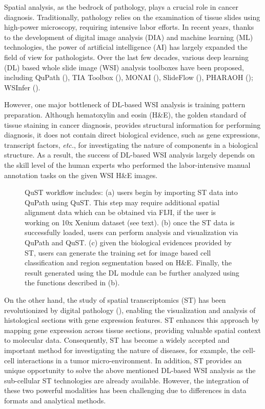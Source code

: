 \documentclass{article}
\begin{document}
Spatial analysis, as the bedrock of pathology, plays a crucial role in cancer diagnosis. Traditionally, pathology relies on the examination of tissue slides using high-power microscopy, requiring intensive labor efforts. In recent years, thanks to the development of digital image analysis (DIA) and machine learning (ML) technologies, the power of artificial intelligence (AI) has largely expanded the field of view for pathologists. Over the last few decades, various deep learning (DL) based whole slide image (WSI) analysis toolboxes have been proposed, including QuPath (\cite{Bankhead:2017}), TIA Toolbox (\cite{Pocock:2022}), MONAI (\cite{Cardoso:2022}), SlideFlow (\cite{Dolezal:2024}), PHARAOH (\cite{Faust:2024}); WSInfer (\cite{Kaczmarzyk:2024}).

However, one major bottleneck of DL-based WSI analysis is  training pattern preparation. Although hematoxylin and eosin (H\&E), the golden standard of tissue staining in cancer diagnosis, provides structural information for performing diagnosis, it does not contain direct biological evidence, such as gene expressions, transcript factors, \textit{etc.}, for investigating the nature of components in a biological structure. As a result, the success of DL-based WSI analysis largely depends on the skill level of the human experts who performed the labor-intensive manual annotation tasks on the given WSI H\&E images.

\begin{figure}[tb]
	\centering
	\caption{QuST workflow includes: (a) users begin by importing ST data into QuPath using QuST. This step may require additional spatial alignment data which can be obtained via FIJI, if the user is working on 10x Xenium dataset (see text). (b) once the ST data is successfully loaded, users can perform analysis and visualization via QuPath and QuST. (c) given the biological evidences provided by ST, users can generate the training set for image based cell classification and region segmentation based on H\&E. Finally, the result generated using the DL module can be further analyzed using the functions described in (b).}
	\label{fig:diagram}
\end{figure}

On the other hand, the study of spatial transcriptomics (ST) has been revolutionized by digital pathology (\cite{NatureMethods:2021}), enabling the visualization and analysis of histological sections with gene expression features. ST enhances this approach by mapping gene expression across tissue sections, providing valuable spatial context to molecular data. Consequently, ST has become a widely accepted and important method for investigating the nature of diseases, for example, the cell-cell interactions in a tumor micro-environment. In addition, ST provides an unique opportunity to solve the above mentioned DL-based WSI analysis as the sub-cellular ST technologies are already available. However, the integration of these two powerful modalities has been challenging due to differences in data formats and analytical methods. 
\end{document}
